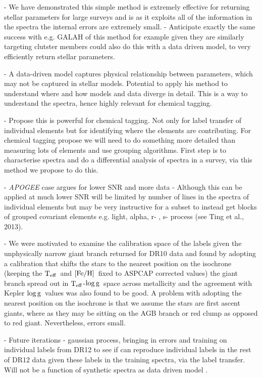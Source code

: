 \documentclass[12pt, preprint]{aastex}
\newcommand{\teff}{\mbox{$\rm T_{eff}$}}
\newcommand{\feh}{\mbox{$\rm [Fe/H]$}}
\newcommand{\logg}{\mbox{$\rm \log g$}}
\begin{document}
- We have demonstrated this simple method is extremely effective for returning stellar parameters for large surveys and is as it exploits all of the information in the spectra the internal errors are extremely small. - Anticipate exactly the same success with e.g. GALAH of this method for example given they are similarly targeting clutster members could also do this with a data driven model, to very efficiently return stellar parameters. 

- A data-driven model captures physical relationship between parameters, which may not be captured in stellar models. Potential to apply his method to understand where and how models and data diverge in detail. This is a way to understand the spectra, hence highly relevant for chemical tagging. 

- Propose this is powerful for chemical tagging. Not only for label transfer of individual elements but for identifying where the elements are contributing. For chemical tagging propose we will need to do something more detailed than measuring lots of elements and use grouping algorithms. First step is to characterise spectra and do a differential analysis of spectra in a survey, via this method we propose to do this. 

- \textit{APOGEE} case argues for lower SNR and more data - Although this can be applied at much lower SNR will be limited by number of lines in the spectra of individual elements but may be very instructive for a subset to instead get blocks of grouped covariant elements e.g. light, alpha, r- , s- process (see Ting et al., 2013).


- We were motivated to examine the calibration space of the labels given the unphysically narrow giant branch returned for DR10 data and found by adopting a calibration that shifts the stars to the nearest position on the isochrone (keeping the \teff\ and \feh\ fixed to ASPCAP corrected values) the giant branch spread out in \teff-\logg\ space across metallicity and the agreement with Kepler \logg\ values was also found to be good. A problem with adopting the nearest position on the isochrone is that we assume the stars are first ascent giants, where as they may be sitting on the AGB branch or red clump as opposed to red giant. Nevertheless, errors small. 

- Future iterations - gaussian process, bringing in errors and training on individual labels from DR12 to see if can reproduce individual labels in the rest of DR12 data given these labels in the training spectra, via the label transfer. Will not be a function of synthetic spectra as data driven model . 
\end{document}

